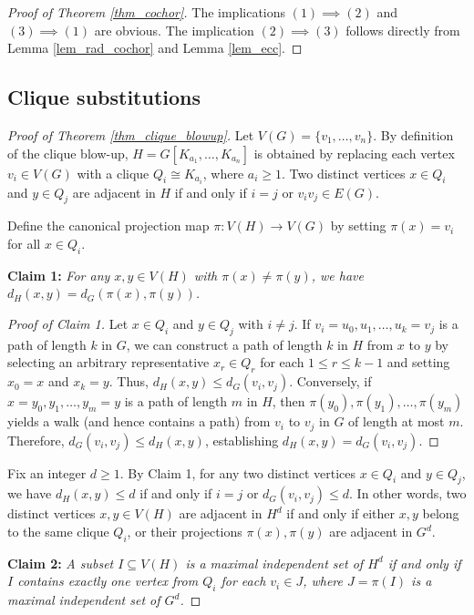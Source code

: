 \documentclass[10pt,a4paper]{amsart}
\numberwithin{equation}{section}
\theoremstyle{definition}
\begin{document}
\begin{proof}[Proof of Theorem \ref{thm_cochor}] 
The implications $(1) \implies (2)$ and $(3) \implies (1)$ are obvious. The implication $(2) \implies (3)$ follows directly from Lemma \ref{lem_rad_cochor} and Lemma \ref{lem_ecc}.
\end{proof}


\subsection{Clique substitutions}
\begin{proof}[Proof of Theorem \ref{thm_clique_blowup}]
Let $V(G) = \{v_1, \ldots, v_n\}$. By definition of the clique blow-up, $H = G[K_{a_1}, \ldots, K_{a_n}]$ is obtained by replacing each vertex $v_i \in V(G)$ with a clique $Q_i \cong K_{a_i}$, where $a_i \ge 1$. Two distinct vertices $x \in Q_i$ and $y \in Q_j$ are adjacent in $H$ if and only if $i = j$ or $v_i v_j \in E(G)$.

Define the canonical projection map $\pi: V(H) \to V(G)$ by setting $\pi(x) = v_i$ for all $x \in Q_i$.

\smallskip
\noindent\textbf{Claim 1:} \emph{For any $x, y \in V(H)$ with $\pi(x) \neq \pi(y)$, we have $d_H(x, y) = d_G(\pi(x), \pi(y))$.}

\begin{proof}[Proof of Claim 1]
Let $x \in Q_i$ and $y \in Q_j$ with $i \neq j$. If $v_i = u_0, u_1, \dots, u_k = v_j$ is a path of length $k$ in $G$, we can construct a path of length $k$ in $H$ from $x$ to $y$ by selecting an arbitrary representative $x_r \in Q_{r}$ for each $1 \le r \le k-1$ and setting $x_0 = x$ and $x_k = y$. Thus, $d_H(x, y) \le d_G(v_i, v_j)$. Conversely, if $x = y_0, y_1, \dots, y_m = y$ is a path of length $m$ in $H$, then $\pi(y_0), \pi(y_1), \dots, \pi(y_m)$ yields a walk (and hence contains a path) from $v_i$ to $v_j$ in $G$ of length at most $m$. Therefore, $d_G(v_i, v_j) \le d_H(x, y)$, establishing $d_H(x, y) = d_G(v_i, v_j)$.
\end{proof}

Fix an integer $d \ge 1$. By Claim 1, for any two distinct vertices $x \in Q_i$ and $y \in Q_j$, we have $d_H(x, y) \le d$ if and only if $i = j$ or $d_G(v_i, v_j) \le d$. In other words, two distinct vertices $x, y \in V(H)$ are adjacent in $H^d$ if and only if either $x, y$ belong to the same clique $Q_i$, or their projections $\pi(x), \pi(y)$ are adjacent in $G^d$.

\smallskip
\noindent\textbf{Claim 2:} \emph{A subset $I \subseteq V(H)$ is a maximal independent set of $H^d$ if and only if $I$ contains exactly one vertex from $Q_i$ for each $v_i \in J$, where $J = \pi(I)$ is a maximal independent set of $G^d$.}


\end{proof}
\end{document}
